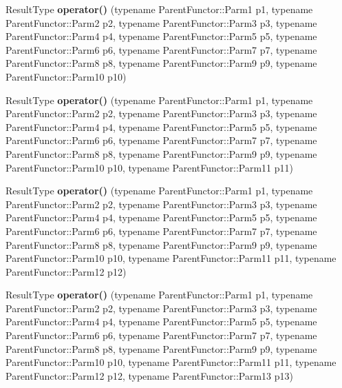 \begin{DoxyCompactItemize}
\item 
\hypertarget{classutilspp_1_1FunctorHandler_a2acd007b15dbbb96efc10f7fcf2e88ad}{Result\-Type {\bfseries operator()} (typename Parent\-Functor\-::\-Parm1 p1, typename Parent\-Functor\-::\-Parm2 p2, typename Parent\-Functor\-::\-Parm3 p3, typename Parent\-Functor\-::\-Parm4 p4, typename Parent\-Functor\-::\-Parm5 p5, typename Parent\-Functor\-::\-Parm6 p6, typename Parent\-Functor\-::\-Parm7 p7, typename Parent\-Functor\-::\-Parm8 p8, typename Parent\-Functor\-::\-Parm9 p9, typename Parent\-Functor\-::\-Parm10 p10)}\label{classutilspp_1_1FunctorHandler_a2acd007b15dbbb96efc10f7fcf2e88ad}

\item 
\hypertarget{classutilspp_1_1FunctorHandler_a0e909e7046ab7f74dcd5c28077999e58}{Result\-Type {\bfseries operator()} (typename Parent\-Functor\-::\-Parm1 p1, typename Parent\-Functor\-::\-Parm2 p2, typename Parent\-Functor\-::\-Parm3 p3, typename Parent\-Functor\-::\-Parm4 p4, typename Parent\-Functor\-::\-Parm5 p5, typename Parent\-Functor\-::\-Parm6 p6, typename Parent\-Functor\-::\-Parm7 p7, typename Parent\-Functor\-::\-Parm8 p8, typename Parent\-Functor\-::\-Parm9 p9, typename Parent\-Functor\-::\-Parm10 p10, typename Parent\-Functor\-::\-Parm11 p11)}\label{classutilspp_1_1FunctorHandler_a0e909e7046ab7f74dcd5c28077999e58}

\item 
\hypertarget{classutilspp_1_1FunctorHandler_aa8879b1e73cdc78612cffa19e7458d8e}{Result\-Type {\bfseries operator()} (typename Parent\-Functor\-::\-Parm1 p1, typename Parent\-Functor\-::\-Parm2 p2, typename Parent\-Functor\-::\-Parm3 p3, typename Parent\-Functor\-::\-Parm4 p4, typename Parent\-Functor\-::\-Parm5 p5, typename Parent\-Functor\-::\-Parm6 p6, typename Parent\-Functor\-::\-Parm7 p7, typename Parent\-Functor\-::\-Parm8 p8, typename Parent\-Functor\-::\-Parm9 p9, typename Parent\-Functor\-::\-Parm10 p10, typename Parent\-Functor\-::\-Parm11 p11, typename Parent\-Functor\-::\-Parm12 p12)}\label{classutilspp_1_1FunctorHandler_aa8879b1e73cdc78612cffa19e7458d8e}

\item 
\hypertarget{classutilspp_1_1FunctorHandler_a1d92a68fec979a2ad613c63a55a0dddc}{Result\-Type {\bfseries operator()} (typename Parent\-Functor\-::\-Parm1 p1, typename Parent\-Functor\-::\-Parm2 p2, typename Parent\-Functor\-::\-Parm3 p3, typename Parent\-Functor\-::\-Parm4 p4, typename Parent\-Functor\-::\-Parm5 p5, typename Parent\-Functor\-::\-Parm6 p6, typename Parent\-Functor\-::\-Parm7 p7, typename Parent\-Functor\-::\-Parm8 p8, typename Parent\-Functor\-::\-Parm9 p9, typename Parent\-Functor\-::\-Parm10 p10, typename Parent\-Functor\-::\-Parm11 p11, typename Parent\-Functor\-::\-Parm12 p12, typename Parent\-Functor\-::\-Parm13 p13)}\label{classutilspp_1_1FunctorHandler_a1d92a68fec979a2ad613c63a55a0dddc}


\end{DoxyCompactItemize}
